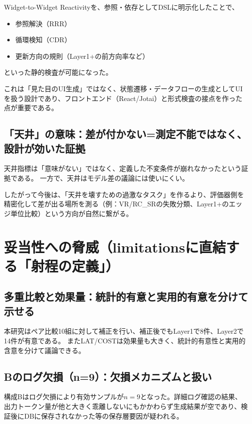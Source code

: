 \documentclass[senior,final,11pt,dvipdfmx]{iputit-thesis}
\begin{document}
Widget-to-Widget Reactivityを、参照・依存としてDSLに明示化したことで、
\begin{itemize}
\item 参照解決（RRR）
\item 循環検知（CDR）
\item 更新方向の規則（Layer1+の前方向率など）
\end{itemize}
といった静的検査が可能になった。

これは「見た目のUI生成」ではなく、状態遷移・データフローの生成としてUIを扱う設計であり、フロントエンド（React/Jotai）と形式検査の接点を作った点が重要である。

\subsection{「天井」の意味：差が付かない=測定不能ではなく、設計が効いた証拠}
\label{subsec:disc_frontend_ceiling}

天井指標は「意味がない」ではなく、定義した不変条件が崩れなかったという証拠である。
一方で、天井はモデル差の議論には使いにくい。

したがって今後は、「天井を壊すための過激なタスク」を作るより、評価器側を精密化して差が出る場所を測る（例：VR/RC\_SRの失敗分類、Layer1+のエッジ単位比較）という方向が自然に繋がる。

\section{妥当性への脅威（limitationsに直結する「射程の定義」）}
\label{sec:disc_threats}

\subsection{多重比較と効果量：統計的有意と実用的有意を分けて示せる}
\label{subsec:disc_threats_stats}

本研究はペア比較10組に対して補正を行い、補正後でもLayer1で8件、Layer2で14件が有意である。
またLAT/COSTは効果量も大きく、統計的有意性と実用的含意を分けて議論できる。

\subsection{Bのログ欠損（n=9）：欠損メカニズムと扱い}
\label{subsec:disc_threats_missing}

構成Bはログ欠損により有効サンプルが$n=9$となった。詳細ログ確認の結果、出力トークン量が他と大きく乖離しないにもかかわらず生成結果が空であり、検証後にDBに保存されなかった等の保存層要因が疑われる。
\end{document}
